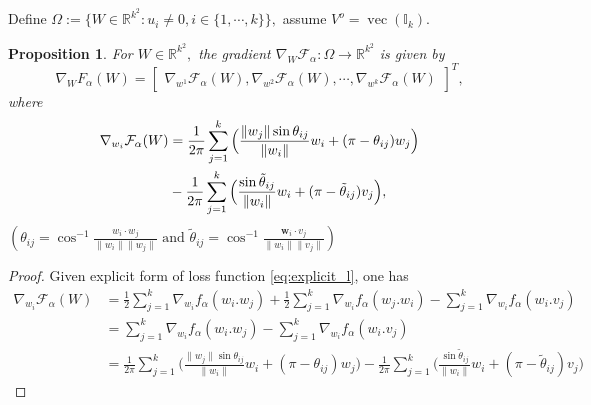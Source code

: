 \documentclass{amsart}%
\def\noi{\noindent}
\newtheorem{proposition}[theorem]{Proposition}
\def\noi{\noindent}
\begin{document}
\noi Define $\Omega:=\{W\in \mathbb R^{k^2}:u_i \neq 0,i\in\{1,\cdots,k\}\},$ assume  $V^o=\operatorname{vec}(\mathbb I_k).$ 
\begin{proposition} For $W\in \mathbb R^{k^2},$ the gradient
$\nabla_{W}\mathcal F_{\alpha}:\Omega\to \mathbb R^{k^2}$ is given by 
\[
\nabla_{W}F_{\alpha}(W)=
{\begin{bmatrix}
   \nabla_{ w^1}\mathcal F_{\alpha}(W),\nabla_{ w^2}\mathcal F_{\alpha}(W),\cdots, \nabla_{ w^k}\mathcal F_{\alpha}(W) 
\end{bmatrix}}^T,
\]
where
\begin{align*}\label{eq:explicit_lg}
\nabla_{w_i}\mathcal F_{\alpha}(W)&=\frac{1}{2\pi}\sum_{j=1}^{k}\Big(\frac{\| w_j\|\sin\theta_{ij}}{\| w_i\|} w_i+(\pi-\theta_{ij}) w_j\Big)\notag\\
&-\frac{1}{2\pi}\sum_{j=1}^{k}\Big(\frac{\sin\tilde{\theta}_{ij}}{\| w_i\|} w_i+(\pi-\tilde{\theta}_{ij}) v_j\Big), 
\end{align*}
$({\theta}_{ij}=\cos^{-1}\frac{ w_i\cdot  w_j}{\| w_i\|\| w_j\|}\text{ and } \tilde{\theta}_{ij}=\cos^{-1}\frac{\mathbf w_i\cdot  v_j}{\| w_i\|\| v_j\|})$
\end{proposition}
\begin{proof}
    Given explicit form of loss function \eqref{eq:explicit_l}, one has
\begin{align*}
 \nabla_{w_i}\mathcal F_{\alpha}(W)&=\frac{1}{2}\sum_{j=1}^{k}\nabla_{ w_i}f_{\alpha}( w_i. w_j)+   \frac{1}{2}\sum_{j=1}^{k}\nabla_{ w_i}f_{\alpha}(w_j. w_i)-\sum_{j=1}^{k}\nabla_{ w_i}f_{\alpha}( w_i. v_j)\\
&=\sum_{j=1}^{k}\nabla_{ w_i}f_{\alpha}(w_i. w_j)-\sum_{j=1}^{k}\nabla_{ w_i}f_{\alpha}( w_i. v_j)\\
&=\frac{1}{2\pi}\sum_{j=1}^{k}\Big(\frac{\| w_j\|\sin\theta_{ij}}{\| w_i\|} w_i+(\pi-\theta_{ij}) w_j\Big)-\frac{1}{2\pi}\sum_{j=1}^{k}\Big(\frac{\sin\tilde{\theta}_{ij}}{\|w_i\|} w_i+(\pi-\tilde{\theta}_{ij}) v_j\Big)
\end{align*}
\end{proof}
\end{document}
